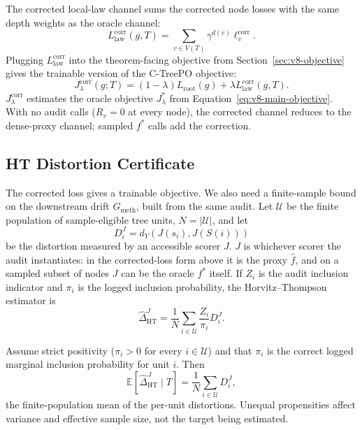 The corrected local-law channel sums the corrected node losses with
the same depth weights as the oracle channel:
\[
  L_{\mathrm{law}}^{\mathrm{corr}}(g,T)
  =
  \sum_{v\in V(T)}\gamma^{d(v)}\ell_v^{\mathrm{corr}} .
\]
Plugging \(L_{\mathrm{law}}^{\mathrm{corr}}\) into the
theorem-facing objective from Section~\ref{sec:v8-objective} gives
the trainable version of the C-TreePO objective:
\begin{equation}
\label{eq:v8-corrected-objective}
  J_\lambda^{\mathrm{corr}}(g;T)
  =
  (1-\lambda)L_{\mathrm{root}}(g)
  +
  \lambda L_{\mathrm{law}}^{\mathrm{corr}}(g,T).
\end{equation}
\(J_\lambda^{\mathrm{corr}}\) estimates the oracle objective
\(J_\lambda^\ast\) from
Equation~\eqref{eq:v8-main-objective}. With no audit calls
(\(R_v=0\) at every node), the corrected channel reduces to the
dense-proxy channel; sampled \(f^\ast\) calls add the correction.

\subsection{HT Distortion Certificate}

The corrected loss gives a trainable objective. We also need a
finite-sample bound on the downstream drift \(G_{\mathrm{meth}}\),
built from the same audit. Let \(\mathcal U\) be the finite
population of sample-eligible tree units, \(N=|\mathcal U|\),
and let
\[
  D_i^J
  =
  d_Y\!\left(J(s_i),J(S(i))\right)
\]
be the distortion measured by an accessible scorer \(J\). \(J\) is
whichever scorer the audit instantiates: in the corrected-loss form
above it is the proxy \(\widehat f\), and on a sampled subset of nodes
\(J\) can be the oracle \(f^\ast\) itself. If \(Z_i\) is the audit
inclusion indicator and \(\pi_i\) is the logged inclusion probability,
the Horvitz--Thompson estimator is
\begin{equation}
\label{eq:v8-ht-distortion}
  \widehat{\Delta}_{\mathrm{HT}}^{J}
  =
  \frac{1}{N}
  \sum_{i\in\mathcal U}
  \frac{Z_i}{\pi_i}D_i^J .
\end{equation}

\begin{proposition}
\label{prop:v10-ht-unbiased}
Assume strict positivity (\(\pi_i>0\) for every \(i\in\mathcal U\)) and
that \(\pi_i\) is the correct logged marginal inclusion probability
for unit \(i\). Then
\[
  \mathbb E\!\left[\widehat{\Delta}_{\mathrm{HT}}^{J}\mid T\right]
  =
  \frac{1}{N}\sum_{i\in\mathcal U}D_i^J ,
\]
the finite-population mean of the per-unit distortions. Unequal
propensities affect variance and effective sample size, not the
target being estimated.
\end{proposition}

